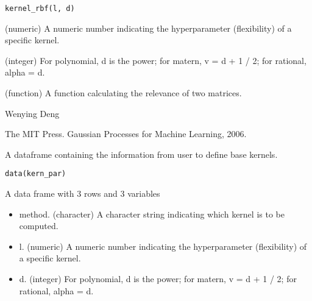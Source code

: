\documentclass[a4paper]{book}
\begin{document}
%
\begin{Usage}
\begin{verbatim}
kernel_rbf(l, d)
\end{verbatim}
\end{Usage}
%
\begin{Arguments}
\begin{ldescription}
\item[\code{l}] (numeric) A numeric number indicating the hyperparameter
(flexibility) of a specific kernel.

\item[\code{d}] (integer) For polynomial, d is the power; for matern, v = d + 1 /
2; for rational, alpha = d.
\end{ldescription}
\end{Arguments}
%
\begin{Details}\relax
{} 
\end{Details}
%
\begin{Value}
\begin{ldescription}
\item[\code{matrix\_wise}] (function) A function calculating the relevance
of two matrices.
\end{ldescription}
\end{Value}
%
\begin{Author}\relax
Wenying Deng
\end{Author}
%
\begin{References}\relax
The MIT Press. Gaussian Processes for Machine Learning, 2006.
\end{References}
%
\begin{Description}\relax
A dataframe containing the information from user to define base kernels.
\end{Description}
%
\begin{Usage}
\begin{verbatim}
data(kern_par)
\end{verbatim}
\end{Usage}
%
\begin{Format}
A data frame with 3 rows and 3 variables
\end{Format}
%
\begin{Details}\relax
\begin{itemize}

\item method. (character) A character string indicating which kernel 
is to be computed.
\item l. (numeric) A numeric number indicating the hyperparameter 
(flexibility) of a specific kernel.
\item d. (integer) For polynomial, d is the power; for matern, v = d + 1 / 2; for
rational, alpha = d.

\end{itemize}

\end{Details}
\end{document}
